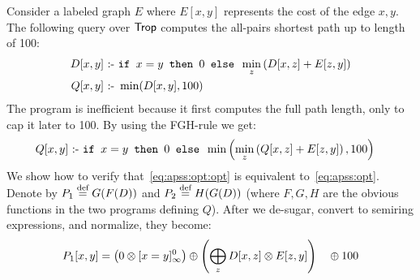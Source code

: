 \begin{ex}[APSP100]\label{ex:sssp100}
  Consider a labeled graph $E$ where $E[x,y]$ represents the cost of
  the edge $x,y$.  The following query over $\text{\sf Trop}$
  computes the all-pairs shortest
  path up to length of 100:
%
{
  \begin{align}
    D[x,y] \text{ :- } & \texttt{if } x=y \texttt{ then } 0 \texttt{ else } \min_{z} \left(D[x,z] +E[z,y]\right) \nonumber \\
    Q[x,y] \text{ :- } & \min(D[x,y],100)  \label{eq:apss:opt}
  \end{align}
}
%
%
%
  The program is inefficient because it first computes the full path
  length, only to cap it later to 100.  By using the FGH-rule we get:
%
{
  \begin{align}
    Q[x,y] \text{ :- } & \texttt{if } x=y \texttt{ then } 0 \texttt{ else } \min\left(\min_{z} \left(Q[x,z]+E[z,y]\right),100\right) \label{eq:apss:opt:opt}
  \end{align}
}
%
We show how to verify
that~\eqref{eq:apss:opt:opt} is equivalent to~\eqref{eq:apss:opt}.
Denote by $P_1 \stackrel{\text{def}}{=} G(F(D))$ and $P_2 \stackrel{\text{def}}{=} H(G(D))$ (where $F,G,H$
are the obvious functions in the two programs defining $Q$).  After we
de-sugar, convert to semiring expressions, and normalize,
they become:
%
{
\begin{alignat*}{2}
  P_{1}[x,y] & =  \left(0 \otimes \totrop{x=y}\right) \oplus \left(\bigoplus_{z} D[x,z] \otimes E[z,y]\right) && \oplus 100 \\

\end{alignat*}}
\end{ex}
